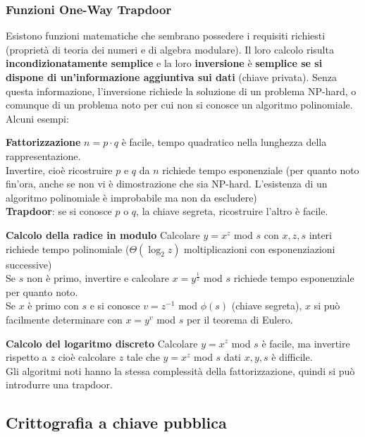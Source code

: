 \documentclass[10pt]{book}
\begin{document}
\subsubsection{Funzioni One-Way Trapdoor}
Esistono funzioni matematiche che sembrano possedere i requisiti richiesti (proprietà di teoria dei numeri e di algebra modulare). Il loro calcolo risulta \textbf{incondizionatamente semplice} e la loro \textbf{inversione} è \textbf{semplice se si dispone di un'informazione aggiuntiva sui dati} (chiave privata). Senza questa informazione, l'inversione richiede la soluzione di un problema NP-hard, o comunque di un problema noto per cui non si conosce un algoritmo polinomiale.\\
Alcuni esempi:
\begin{list}{}{}
	\item \textbf{Fattorizzazione} $n = p\cdot q$ è facile, tempo quadratico nella lunghezza della rappresentazione.\\
	Invertire, cioè ricostruire $p$ e $q$ da $n$ richiede tempo esponenziale (per quanto noto fin'ora, anche se non vi è dimostrazione che sia NP-hard. L'esistenza di un algoritmo polinomiale è improbabile ma non da escludere)\\
	\textbf{Trapdoor}: se si conosce $p$ o $q$, la chiave segreta, ricostruire l'altro è facile.
	\item \textbf{Calcolo della radice in modulo} Calcolare $y = x^z$ mod $s$ con $x,z,s$ interi richiede tempo polinomiale ($\Theta(\log_2 z)$ moltiplicazioni con esponenziazioni successive)\\
Se $s$ non è primo, invertire e calcolare $x = y^{\frac{1}{z}}$ mod $s$ richiede tempo esponenziale per quanto noto.\\
Se $x$ è primo con $s$ e si conosce $v = z^{-1}$ mod $\phi(s)$ (chiave segreta), $x$ si può facilmente determinare con $x = y^v$ mod $s$ per il teorema di Eulero.
	\item \textbf{Calcolo del logaritmo discreto} Calcolare $y = x^z$ mod $s$ è facile, ma invertire rispetto a $z$ cioè calcolare $z$ tale che $y = x^z$ mod $s$ dati $x,y,s$ è difficile.\\
	Gli algoritmi noti hanno la stessa complessità della fattorizzazione, quindi si può introdurre una trapdoor.
\end{list}

\subsection{Crittografia a chiave pubblica}
\end{document}
